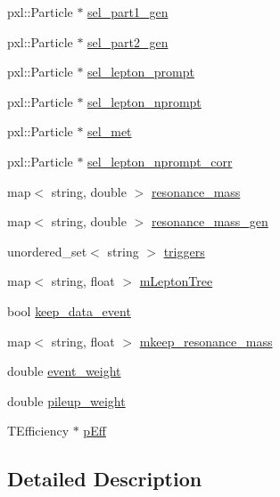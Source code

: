 \begin{DoxyCompactItemize}
pxl\-::\-Particle $\ast$ \hyperlink{classspecialAna_a9beb30fa9c4671d0b5d6a35df0470fa8}{sel\-\_\-part1\-\_\-gen}
\item 
pxl\-::\-Particle $\ast$ \hyperlink{classspecialAna_a5e06d3c9b3b9dbd2353e7abf1645d32e}{sel\-\_\-part2\-\_\-gen}
\item 
pxl\-::\-Particle $\ast$ \hyperlink{classspecialAna_aee9025a3b86abbffe066e42aa521d801}{sel\-\_\-lepton\-\_\-prompt}
\item 
pxl\-::\-Particle $\ast$ \hyperlink{classspecialAna_a2bb3bd3f562063bd54fa72eb36a4d7de}{sel\-\_\-lepton\-\_\-nprompt}
\item 
pxl\-::\-Particle $\ast$ \hyperlink{classspecialAna_adf5da0cbdfda1f8b7e2504cdd3506ba0}{sel\-\_\-met}
\item 
pxl\-::\-Particle $\ast$ \hyperlink{classspecialAna_aa92d86a2b74ba4f7157522752e638a22}{sel\-\_\-lepton\-\_\-nprompt\-\_\-corr}
\item 
map$<$ string, double $>$ \hyperlink{classspecialAna_a1af23a7951217b703465b152e08d8ec6}{resonance\-\_\-mass}
\item 
map$<$ string, double $>$ \hyperlink{classspecialAna_aa0c7fe4e8cb8142f2f8f4c4967e658b2}{resonance\-\_\-mass\-\_\-gen}
\item 
unordered\-\_\-set$<$ string $>$ \hyperlink{classspecialAna_a7578000c63d8e3555315047763358e32}{triggers}
\item 
map$<$ string, float $>$ \hyperlink{classspecialAna_ae7c181ead078f2fec53d80943afe9352}{m\-Lepton\-Tree}
\item 
bool \hyperlink{classspecialAna_affbbcba600d494b2dbb3397bea059672}{keep\-\_\-data\-\_\-event}
\item 
map$<$ string, float $>$ \hyperlink{classspecialAna_a94f42f297f53448b135d5586055bb7d1}{mkeep\-\_\-resonance\-\_\-mass}
\item 
double \hyperlink{classspecialAna_aaafb641b3e4372a247d24b678ed4a549}{event\-\_\-weight}
\item 
double \hyperlink{classspecialAna_a2b5b5144746c7a945308b1700a0b0a10}{pileup\-\_\-weight}
\item 
T\-Efficiency $\ast$ \hyperlink{classspecialAna_a1271615b07b243df0bd09c1c612258af}{p\-Eff}
\end{DoxyCompactItemize}


\subsection{Detailed Description}



